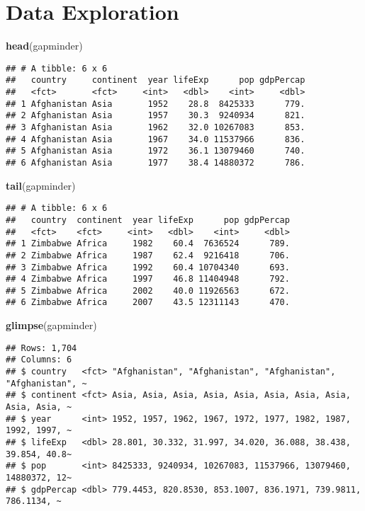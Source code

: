 \documentclass[
]{article}
\newenvironment{Shaded}{\begin{snugshade}}{\end{snugshade}}
\newcommand{\FunctionTok}[1]{\textcolor[rgb]{0.13,0.29,0.53}{\textbf{#1}}}
\newcommand{\NormalTok}[1]{#1}
\begin{document}
\section{Data Exploration}\label{data-exploration}

\begin{Shaded}
\begin{Highlighting}[]
\FunctionTok{head}\NormalTok{(gapminder)}
\end{Highlighting}
\end{Shaded}

\begin{verbatim}
## # A tibble: 6 x 6
##   country     continent  year lifeExp      pop gdpPercap
##   <fct>       <fct>     <int>   <dbl>    <int>     <dbl>
## 1 Afghanistan Asia       1952    28.8  8425333      779.
## 2 Afghanistan Asia       1957    30.3  9240934      821.
## 3 Afghanistan Asia       1962    32.0 10267083      853.
## 4 Afghanistan Asia       1967    34.0 11537966      836.
## 5 Afghanistan Asia       1972    36.1 13079460      740.
## 6 Afghanistan Asia       1977    38.4 14880372      786.
\end{verbatim}

\begin{Shaded}
\begin{Highlighting}[]
\FunctionTok{tail}\NormalTok{(gapminder)}
\end{Highlighting}
\end{Shaded}

\begin{verbatim}
## # A tibble: 6 x 6
##   country  continent  year lifeExp      pop gdpPercap
##   <fct>    <fct>     <int>   <dbl>    <int>     <dbl>
## 1 Zimbabwe Africa     1982    60.4  7636524      789.
## 2 Zimbabwe Africa     1987    62.4  9216418      706.
## 3 Zimbabwe Africa     1992    60.4 10704340      693.
## 4 Zimbabwe Africa     1997    46.8 11404948      792.
## 5 Zimbabwe Africa     2002    40.0 11926563      672.
## 6 Zimbabwe Africa     2007    43.5 12311143      470.
\end{verbatim}

\begin{Shaded}
\begin{Highlighting}[]
\FunctionTok{glimpse}\NormalTok{(gapminder)}
\end{Highlighting}
\end{Shaded}

\begin{verbatim}
## Rows: 1,704
## Columns: 6
## $ country   <fct> "Afghanistan", "Afghanistan", "Afghanistan", "Afghanistan", ~
## $ continent <fct> Asia, Asia, Asia, Asia, Asia, Asia, Asia, Asia, Asia, Asia, ~
## $ year      <int> 1952, 1957, 1962, 1967, 1972, 1977, 1982, 1987, 1992, 1997, ~
## $ lifeExp   <dbl> 28.801, 30.332, 31.997, 34.020, 36.088, 38.438, 39.854, 40.8~
## $ pop       <int> 8425333, 9240934, 10267083, 11537966, 13079460, 14880372, 12~
## $ gdpPercap <dbl> 779.4453, 820.8530, 853.1007, 836.1971, 739.9811, 786.1134, ~
\end{verbatim}
\end{document}
